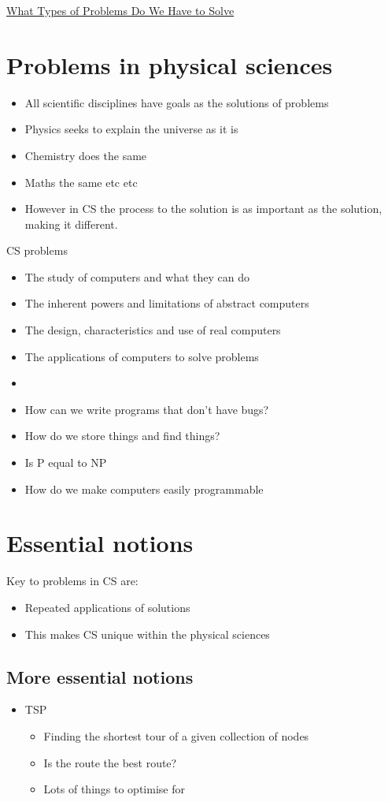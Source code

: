 \documentclass{article}[18pt]
\begin{document}
\begin{center}
\underline{\huge What Types of Problems Do We Have to Solve}
\end{center}
\section{Problems in physical sciences}
\begin{itemize}
\item All scientific disciplines have goals as the solutions of problems
\item Physics seeks to explain the universe as it is
\item Chemistry does the same
\item Maths the same etc etc
\item However in CS the process to the solution is as important as the solution, making it different. 
\end{itemize}
CS problems
\begin{itemize}
\item The study of computers and what they can do
\item The inherent powers and limitations of abstract computers
\item The design, characteristics and use of real computers
\item The applications of computers to solve problems
\item 
\item How can we write programs that don't have bugs?
\item How do we store things and find things?
\item Is P equal to NP
\item How do we make computers easily programmable
\end{itemize}
\section{Essential notions}
Key to problems in CS are:
\begin{itemize}
\item Repeated applications of solutions
\item This makes CS unique within the physical sciences
\end{itemize}
\subsection{More essential notions}
\begin{itemize}
\item TSP
\begin{itemize}
\item Finding the shortest tour of a given collection of nodes
\item Is the route the best route?
\item Lots of things to optimise for
\end{itemize}
\end{itemize}
\end{document}
